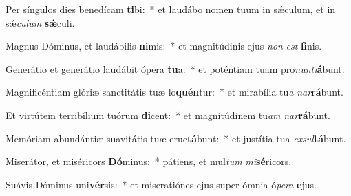 \item Per síngulos dies benedícam \textbf{ti}bi:~* et laudábo nomen tuum in sǽculum, et in sǽ\textit{cu}\textit{lum} \textbf{sǽ}culi.
\item Magnus Dóminus, et laudábilis \textbf{ni}mis:~* et magnitúdinis ejus \textit{non} \textit{est} \textbf{fi}nis.
\item Generátio et generátio laudábit ópera \textbf{tu}a:~* et poténtiam tuam pro\textit{nun}\textit{ti}\textbf{á}bunt.
\item Magnificéntiam glóriæ sanctitátis tuæ lo\textbf{quén}tur:~* et mirabília tu\textit{a} \textit{nar}\textbf{rá}bunt.
\item Et virtútem terribílium tuórum \textbf{di}cent:~* et magnitúdinem tu\textit{am} \textit{nar}\textbf{rá}bunt.
\item Memóriam abundántiæ suavitátis tuæ eruc\textbf{tá}bunt:~* et justítia tua \textit{ex}\textit{sul}\textbf{tá}bunt.
\item Miserátor, et miséricors \textbf{Dó}minus:~* pátiens, et mul\textit{tum} \textit{mi}\textbf{sé}ricors.
\item Suávis Dóminus uni\textbf{vér}sis:~* et miseratiónes ejus super ómnia ó\textit{pe}\textit{ra} \textbf{e}jus.
